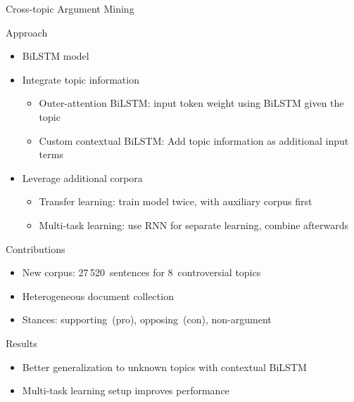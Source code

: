 \documentclass[english,handout]{mlutalk}
\newcommand{\BiLSTM}{\mbox{BiLSTM}\xspace}
\begin{document}
\begin{frame}[allowframebreaks]{Cross-topic Argument Mining~\cite{StabMSRG2018}}

  \begin{block}{Approach}
    \begin{itemize}
      \item \BiLSTM model
      \item Integrate topic information
      \begin{itemize}
        \item Outer-attention \BiLSTM: input token weight using \BiLSTM given the topic
        \item Custom contextual \BiLSTM: Add topic information as additional input terms
      \end{itemize}
      \item Leverage additional corpora
      \begin{itemize}
        \item Transfer learning: train model twice, with auxiliary corpus first
        \item Multi-task learning: use RNN for separate learning, combine afterwards
      \end{itemize}
    \end{itemize}
  \end{block}

  \framebreak

  \begin{block}{Contributions}
    \begin{itemize}
      \item New corpus: 27\,520~sentences for 8~controversial topics
      \item Heterogeneous document collection
      \item Stances: supporting~(pro), opposing~(con), non-argument
    \end{itemize}
  \end{block}

  \begin{block}{Results}
    \begin{itemize}
      \item Better generalization to unknown topics with contextual \BiLSTM
      \item Multi-task learning setup improves performance
    \end{itemize}
  \end{block}
  
\end{frame}
\end{document}
